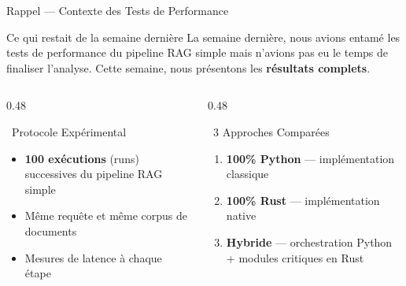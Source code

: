 \documentclass[aspectratio=169]{beamer}
\begin{document}
\begin{frame}{Rappel — Contexte des Tests de Performance}
  \begin{block}{Ce qui restait de la semaine dernière}
    \small
    La semaine dernière, nous avions entamé les tests de performance du pipeline RAG simple mais n'avions pas eu le temps de finaliser l'analyse. Cette semaine, nous présentons les \textbf{résultats complets}.
  \end{block}
  \vspace{0.3cm}
  \begin{columns}[T]
    \begin{column}{0.48\textwidth}
      \begin{exampleblock}{\faFlask\ Protocole Expérimental}
        \small
        \begin{itemize}
          \item \textbf{100 exécutions} (runs) successives du pipeline RAG simple
          \item Même requête et même corpus de documents
          \item Mesures de latence à chaque étape
        \end{itemize}
      \end{exampleblock}
    \end{column}
    \begin{column}{0.48\textwidth}
      \begin{alertblock}{\faCodeBranch\ 3 Approches Comparées}
        \small
        \begin{enumerate}
          \item \textbf{100\% Python} — implémentation classique
          \item \textbf{100\% Rust} — implémentation native
          \item \textbf{Hybride} — orchestration Python + modules critiques en Rust
        \end{enumerate}
      \end{alertblock}
    \end{column}
  \end{columns}
\end{frame}
\end{document}

